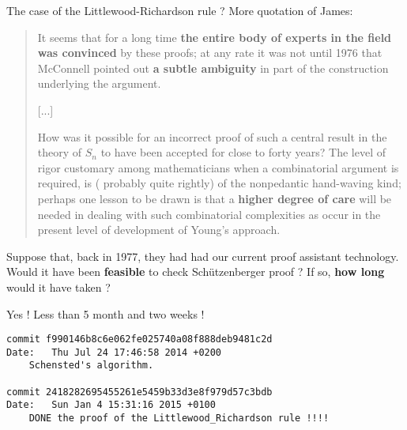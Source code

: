 \documentclass[compress,11pt]{beamer}
\newcommand{\red}[1]{{\color{red} #1}}
\newcommand{\grn}[1]{{\color{green} #1}}
\begin{document}
\begin{frame}{The case of the Littlewood-Richardson rule ?}
More quotation of James:

\begin{quotation}\small
  It seems that for a long time \textbf{the entire body of experts in the
    field was convinced} by these proofs; at any rate it was not until 1976
  that McConnell pointed out \textbf{a subtle ambiguity} in part of the
  construction underlying the argument.

  [...]

  How was it possible for an \red{incorrect proof} of such a central result in
  the theory of $S_n$ to have been \red{accepted for close to forty years}?
  The level of rigor customary among mathematicians when a combinatorial
  argument is required, is (\grn{probably quite rightly}) of the
  \grn{nonpedantic hand-waving} kind; perhaps one lesson to be drawn is that
  a \textbf{higher degree of care} will be needed in dealing with such
  combinatorial complexities as occur in the present level of development of
  Young's approach.
\end{quotation}
\end{frame}

\begin{frame}[fragile]
  \begin{problem}
    Suppose that, back in 1977, they had had our current proof assistant
    technology. Would it have been \textbf{feasible} to check Schützenberger
    proof ? If so, \textbf{how long} would it have taken ?
  \end{problem}
  \bigskip\pause

  \begin{Theorem}
    Yes ! Less than 5 month and two weeks !
  \end{Theorem}

\small
\begin{verbatim}
commit f990146b8c6e062fe025740a08f888deb9481c2d
Date:   Thu Jul 24 17:46:58 2014 +0200
    Schensted's algorithm.

commit 2418282695455261e5459b33d3e8f979d57c3bdb
Date:   Sun Jan 4 15:31:16 2015 +0100
    DONE the proof of the Littlewood_Richardson rule !!!!
\end{verbatim}
\end{frame}
\end{document}
